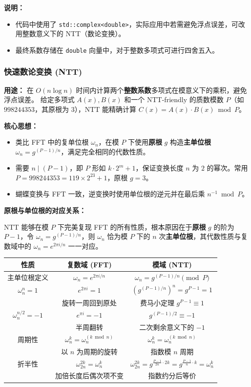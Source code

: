 \textbf{说明：}
\begin{itemize}
    \item 代码中使用了 \texttt{std::complex<double>}，实际应用中若需避免浮点误差，可改用整数意义下的 NTT（数论变换）。
    \item 最终系数存储在 \texttt{double} 向量中，对于整数多项式可进行四舍五入。
\end{itemize}

\subsubsection{快速数论变换 (NTT)}

\textbf{用途：}  
在 $O(n\log n)$ 时间内计算两个\textbf{整数系数}多项式在模意义下的乘积，避免浮点误差。  
给定多项式 $A(x),B(x)$ 和一个 NTT-friendly 的质数模数 $P$（如 $998244353$，其原根为 $3$），NTT 能精确计算 $C(x)=A(x)\cdot B(x) \bmod P$。

\textbf{核心思想：}
\begin{itemize}
    \item 类比 FFT 中的复单位根 $\omega_n$，在模 $P$ 下使用\textbf{原根} $g$ 构造\textbf{主单位根} $\omega_n = g^{(P-1)/n}$，满足完全相同的代数性质。
    \item 需要 $n \mid (P-1)$，即 $P$ 形如 $k\cdot 2^m+1$，保证变换长度 $n$ 为 $2$ 的幂次。常用 $P=998244353=119\times 2^{23}+1$，原根 $g=3$。
    \item 蝴蝶变换与 FFT 一致，逆变换时使用单位根的逆元并在最后乘 $n^{-1}\bmod P$。
\end{itemize}

\textbf{原根与单位根的对应关系：}

NTT 能够在模 $P$ 下完美复现 FFT 的所有性质，根本原因在于\textbf{原根} $g$ 的阶为 $P-1$，令 $\omega_n = g^{(P-1)/n}$，则 $\omega_n$ 恰为模 $P$ 下的 $n$ 次\textbf{主单位根}，其代数性质与复数域中的 $\omega_n = e^{2\pi i/n}$ 一一对应。

\begin{tabular}{|c|c|c|}
\hline
\textbf{性质} & \textbf{复数域 (FFT)} & \textbf{模域 (NTT)} \\ \hline
主单位根定义 & $\omega_n = e^{2\pi i/n}$ & $\omega_n = g^{(P-1)/n} \pmod{P}$ \\
\hline
$\omega_n^n = 1$ & $e^{2\pi i}=1$ & $\left(g^{(P-1)/n}\right)^n = g^{P-1} = 1$ \\
   & 旋转一周回到原处 & 费马小定理 $g^{P-1}\equiv 1$ \\
\hline
$\omega_n^{n/2} = -1$ & $e^{\pi i} = -1$ & $g^{(P-1)/2} \equiv -1$ \\
   & 半周翻转 & 二次剩余意义下的 $-1$ \\
\hline
周期性 & $\omega_n^k = \omega_n^{(k \bmod n)}$ & $\omega_n^k = \omega_n^{(k \bmod n)}$ \\
   & 以 $n$ 为周期的旋转 & 指数模 $n$ 周期 \\
\hline
折半性 & $\omega_{2n}^{2k} = \omega_n^k$ & $\omega_{2n}^{2k} = g^{\frac{P-1}{2n}\cdot 2k} = g^{\frac{P-1}{n}\cdot k} = \omega_n^k$ \\
   & 加倍长度后偶次项不变 & 指数约分后等价 \\
\hline
\end{tabular}

